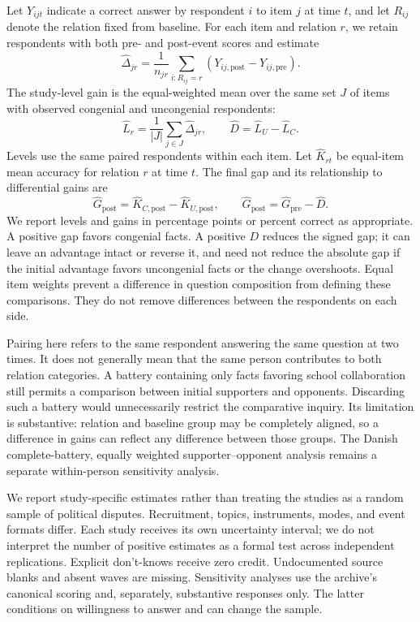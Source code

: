 Let $Y_{ijt}$ indicate a correct answer by respondent $i$ to item $j$ at time $t$, and let $R_{ij}$ denote the relation fixed from baseline. For each item and relation $r$, we retain respondents with both pre- and post-event scores and estimate
\[
\widehat\Delta_{jr}
=\frac{1}{n_{jr}}\sum_{i:R_{ij}=r}
  (Y_{ij,\mathrm{post}}-Y_{ij,\mathrm{pre}}).
\]
The study-level gain is the equal-weighted mean over the same set $J$ of items with observed congenial and uncongenial respondents:
\[
\widehat L_r=\frac{1}{|J|}\sum_{j\in J}\widehat\Delta_{jr},
\qquad
\widehat D=\widehat L_U-\widehat L_C.
\]
Levels use the same paired respondents within each item. Let $\widehat K_{rt}$ be equal-item mean accuracy for relation $r$ at time $t$. The final gap and its relationship to differential gains are
\[
\widehat G_{\mathrm{post}}=\widehat K_{C,\mathrm{post}}-\widehat K_{U,\mathrm{post}},
\qquad
\widehat G_{\mathrm{post}}=\widehat G_{\mathrm{pre}}-\widehat D.
\]
We report levels and gains in percentage points or percent correct as appropriate. A positive gap favors congenial facts. A positive $D$ reduces the signed gap; it can leave an advantage intact or reverse it, and need not reduce the absolute gap if the initial advantage favors uncongenial facts or the change overshoots. Equal item weights prevent a difference in question composition from defining these comparisons. They do not remove differences between the respondents on each side.

Pairing here refers to the same respondent answering the same question at two times. It does not generally mean that the same person contributes to both relation categories. A battery containing only facts favoring school collaboration still permits a comparison between initial supporters and opponents. Discarding such a battery would unnecessarily restrict the comparative inquiry. Its limitation is substantive: relation and baseline group may be completely aligned, so a difference in gains can reflect any difference between those groups. The Danish complete-battery, equally weighted supporter--opponent analysis remains a separate within-person sensitivity analysis.

We report study-specific estimates rather than treating the studies as a random sample of political disputes. Recruitment, topics, instruments, modes, and event formats differ. Each study receives its own uncertainty interval; we do not interpret the number of positive estimates as a formal test across independent replications. Explicit don't-knows receive zero credit. Undocumented source blanks and absent waves are missing. Sensitivity analyses use the archive's canonical scoring and, separately, substantive responses only. The latter conditions on willingness to answer and can change the sample.


